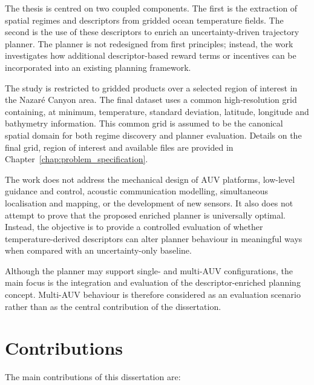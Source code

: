 The thesis is centred on two coupled components. The first is the extraction of spatial regimes and descriptors from gridded ocean temperature fields. The second is the use of these descriptors to enrich an uncertainty-driven trajectory planner. The planner is not redesigned from first principles; instead, the work investigates how additional descriptor-based reward terms or incentives can be incorporated into an existing planning framework.

The study is restricted to gridded products over a selected region of interest in the Nazaré Canyon area. The final dataset uses a common high-resolution grid containing, at minimum, temperature, standard deviation, latitude, longitude and bathymetry information. This common grid is assumed to be the canonical spatial domain for both regime discovery and planner evaluation. Details on the final grid, region of interest and available files are provided in Chapter~\ref{chap:problem_specification}.

The work does not address the mechanical design of AUV platforms, low-level guidance and control, acoustic communication modelling, simultaneous localisation and mapping, or the development of new sensors. It also does not attempt to prove that the proposed enriched planner is universally optimal. Instead, the objective is to provide a controlled evaluation of whether temperature-derived descriptors can alter planner behaviour in meaningful ways when compared with an uncertainty-only baseline.

Although the planner may support single- and multi-AUV configurations, the main focus is the integration and evaluation of the descriptor-enriched planning concept. Multi-AUV behaviour is therefore considered as an evaluation scenario rather than as the central contribution of the dissertation.
\section{Contributions} \label{sec:contributions}

The main contributions of this dissertation are:

